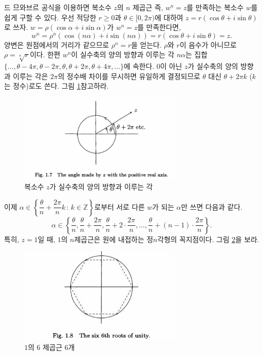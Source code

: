 드 므와브르 공식을 이용하면
복소수  $z$의 $n$ 제곱근
즉, $w^n=z$를 만족하는 복소수 $w$를 쉽게 구할 수 있다.
우선 적당한 $r\ge0$과 $\theta\in[0,2\pi)$에 대하여 $z=r(\cos\theta + i \sin\theta)$로 쓰자.
$w= \rho(\cos\alpha + i\sin\alpha)$가 $w^n=z$를 만족한다면,
$$
w^n = \rho^n\left( \cos(n\alpha) + i\sin(n\alpha)\right) = r(\cos\theta + i\sin\theta)= z.
$$
양변은 원점에서의 거리가 같으므로 $\rho^n=r$을 얻는다.
$\rho$와 $r$이 음수가 아니므로 $\rho = \sqrt[n]{r}$이다.
한편 $w^n$이 실수축의 양의 방향과 이루는 각 $n\alpha$는 
집합 $ \{ \ldots, \theta - 4\pi, \theta - 2\pi, \theta, \theta+2\pi, \theta+4\pi, \ldots\} $에 속한다.
$0$이 아닌 $z$가 실수축의 양의 방향과 이루는 각은 $2\pi$의 정수배 차이를 무시하면 유일하게 결정되므로
$\theta$ 대신 $\theta + 2\pi k$ ($k$는 정수)로도 쓴다. 그림 \ref{fig-1-7}\을 참고하라.

\begin{figure}[!h]
\begin{center}
\includegraphics[width=0.7\textwidth]{./SaltChapter/fig-1-7}
\end{center}
\caption{복소수 $z$가 실수축의 양의 방향과 이루는 각}
\label{fig-1-7}
\end{figure}

이제 $\alpha \in \left\{ \dfrac{\theta}{n}+ \dfrac{2\pi}{n}k \,:\, k\in\mathbb Z \right\}$로부터
서로 다른 $w$가 되는 $\alpha$만 쓰면 다음과 같다.
$$
\alpha \in \left\{
\dfrac\theta n,  \dfrac\theta n+ \dfrac{2\pi}n, \dfrac\theta n + 2\cdot \dfrac{2\pi}n, \ldots,
\dfrac\theta n+ (n-1)\cdot \dfrac{2\pi}n
\right\}.
$$
특히, $z=1$일 때, $1$의 $n$제곱근은 원에 내접하는 정$n$각형의 꼭지점이다.
그림 \ref{fig-1-8}을 보라.
\begin{figure}[!h]
\begin{center}
\includegraphics[width=0.7\textwidth]{./SaltChapter/fig-1-8}
\end{center}
\caption{$1$의 $6$ 제곱근 $6$개}
\label{fig-1-8}
\end{figure}


